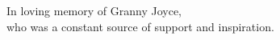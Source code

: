 \begin{dedication}
    In loving memory of Granny Joyce,\\
    who was a constant source of support and inspiration.
\end{dedication}
